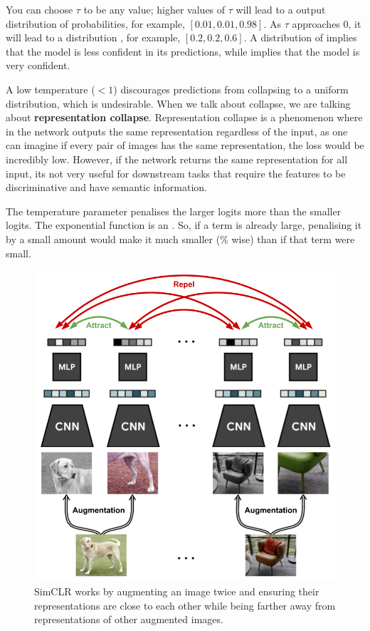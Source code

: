 You can choose $\tau$ to be any value; higher values of $\tau$ will lead to a  output distribution of probabilities, for example, $\left[0.01,0.01,0.98\right]$.
As $\tau$ approaches $0$, it will lead to a distribution , for example, $\left[0.2,0.2,0.6\right]$.
A distribution of  implies that the model is less confident in its predictions, while  implies that the model is very confident.

A low temperature ($<1$) discourages predictions from collapsing to a uniform distribution, which is undesirable. When we talk about collapse, we are talking about \textbf{representation collapse}. Representation collapse is a phenomenon where in the network outputs the same representation regardless of the input, as one can imagine if every pair of images has the same representation, the loss would be incredibly low. However, if the network returns the same representation for all input, its not very useful for downstream tasks that require the features to be discriminative and have semantic information.

\begin{tcolorbox}[title=Intuition for Temperature]
The temperature parameter penalises the larger logits more than the smaller logits. The exponential function is an . So, if a term is already large, penalising it by a small amount would make it much smaller (\% wise) than if that term were small.
\end{tcolorbox}

\begin{figure}
    \centering
    \includegraphics[scale=0.4]{chapters/assets/ssl_figs/simclr_contrastive_learning.png}
    \caption{SimCLR works by augmenting an image twice and ensuring their representations are close to each other while being farther away from representations of other augmented images.}
    \label{fig:simclr}
\end{figure}